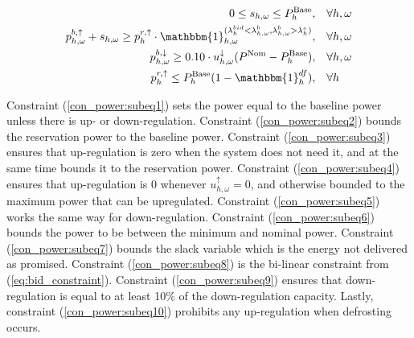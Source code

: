 {\begin{subequations}
\begin{align}
        0 \leq s_{h,\omega} \leq P^{\text{Base}}_{h}, \quad                                                                                                                                            & \forall{h,\omega}                                                                             \label{con_power:subeq7}  \\
        p^{b, \uparrow}_{h,\omega} + s_{h,\omega} \geq p^{r,\uparrow}_{h} \cdot \mathbbm{1}_{h,\omega}^{(\lambda^{bid}_{h} < \lambda^{b}_{h,\omega}, \lambda^{b}_{h,\omega} > \lambda^{s}_{h})}, \quad & \forall{h,\omega} \label{con_power:subeq8}                                                                              \\
        p^{b, \downarrow}_{h,\omega} \geq 0.10 \cdot u^{\downarrow}_{h,\omega} (P^{\text{Nom}} - P^{\text{Base}}_{h}), \quad                                                                           & \forall{h,\omega}                                                                             \label{con_power:subeq9}  \\
        p^{r, \uparrow}_{h} \leq P^{\text{Base}}_{h} (1 - \mathbbm{1}_{h}^{df}), \quad                                                                                                                 & \forall{h} \label{con_power:subeq10}
    \end{align}
\end{subequations}

Constraint (\ref{con_power:subeq1}) sets the power equal to the baseline power unless there is up- or down-regulation. Constraint (\ref{con_power:subeq2}) bounds the reservation power to the baseline power. Constraint (\ref{con_power:subeq3}) ensures that up-regulation is zero when the system does not need it, and at the same time bounds it to the reservation power. Constraint (\ref{con_power:subeq4}) ensures that up-regulation is 0 whenever $u^{\uparrow}_{h,\omega} = 0$, and otherwise bounded to the maximum power that can be upregulated. Constraint (\ref{con_power:subeq5}) works the same way for down-regulation. Constraint (\ref{con_power:subeq6}) bounds the power to be between the minimum and nominal power. Constraint (\ref{con_power:subeq7}) bounds the slack variable which is the energy not delivered as promised. Constraint (\ref{con_power:subeq8}) is the bi-linear constraint from (\ref{eq:bid_constraint}). Constraint (\ref{con_power:subeq9}) ensures that down-regulation is equal to at least 10\% of the down-regulation capacity. Lastly, constraint (\ref{con_power:subeq10}) prohibits any up-regulation when defrosting occurs.

}
